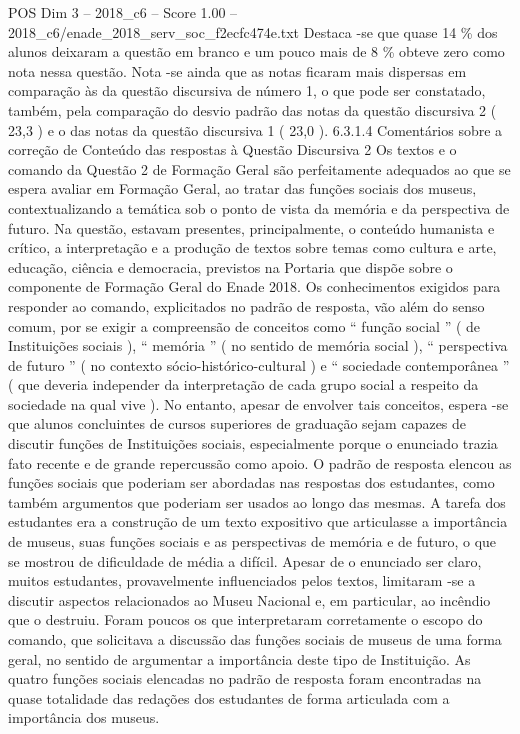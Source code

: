 \begin{textsample}{POS Dim 3 – 2018\_c6 – Score 1.00 – 2018\_c6/enade\_2018\_serv\_soc\_f2ecfc474e.txt}
Destaca -se que quase 14 \% dos alunos deixaram a questão em branco e um pouco mais de 8 \% obteve zero como nota nessa questão.
Nota -se ainda que as notas ficaram mais dispersas em comparação às da questão discursiva de número 1, o que pode ser constatado, também, pela comparação do desvio padrão das notas da questão discursiva 2 ( 23,3 ) e o das notas da questão discursiva 1 ( 23,0 ). 6.3.1.4 Comentários sobre a correção de Conteúdo das respostas à Questão Discursiva 2 Os textos e o comando da Questão 2 de Formação Geral são perfeitamente adequados ao que se espera avaliar em Formação Geral, ao tratar das funções sociais dos museus, contextualizando a temática sob o ponto de vista da memória e da perspectiva de futuro.
Na questão, estavam presentes, principalmente, o conteúdo humanista e crítico, a interpretação e a produção de textos sobre temas como cultura e arte, educação, ciência e democracia, previstos na Portaria que dispõe sobre o componente de Formação Geral do Enade 2018.
Os conhecimentos exigidos para responder ao comando, explicitados no padrão de resposta, vão além do senso comum, por se exigir a compreensão de conceitos como “ função social ” ( de Instituições sociais ), “ memória ” ( no sentido de memória social ), “ perspectiva de futuro ” ( no contexto sócio-histórico-cultural ) e “ sociedade contemporânea ” ( que deveria independer da interpretação de cada grupo social a respeito da sociedade na qual vive ).
No entanto, apesar de envolver tais conceitos, espera -se que alunos concluintes de cursos superiores de graduação sejam capazes de discutir funções de Instituições sociais, especialmente porque o enunciado trazia fato recente e de grande repercussão como apoio.
O padrão de resposta elencou as funções sociais que poderiam ser abordadas nas respostas dos estudantes, como também argumentos que poderiam ser usados ao longo das mesmas.
A tarefa dos estudantes era a construção de um texto expositivo que articulasse a importância de museus, suas funções sociais e as perspectivas de memória e de futuro, o que se mostrou de dificuldade de média a difícil.
Apesar de o enunciado ser claro, muitos estudantes, provavelmente influenciados pelos textos, limitaram -se a discutir aspectos relacionados ao Museu Nacional e, em particular, ao incêndio que o destruiu.
Foram poucos os que interpretaram corretamente o escopo do comando, que solicitava a discussão das funções sociais de museus de uma forma geral, no sentido de argumentar a importância deste tipo de Instituição.
As quatro funções sociais elencadas no padrão de resposta foram encontradas na quase totalidade das redações dos estudantes de forma articulada com a importância dos museus.

\end{textsample}
